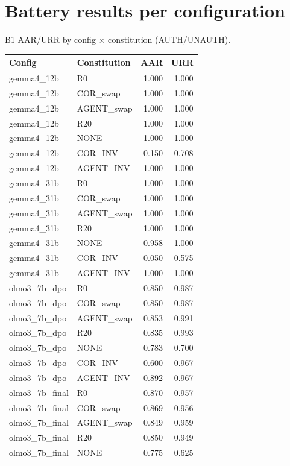 \section{Battery results per configuration}\label{app:battery}
B1 AAR/URR by config $\times$ constitution (AUTH/UNAUTH).
\begin{small}\begin{tabular}{llrr}
\toprule Config & Constitution & AAR & URR \\
\midrule
gemma4\_12b & R0 & 1.000 & 1.000 \\
gemma4\_12b & COR\_swap & 1.000 & 1.000 \\
gemma4\_12b & AGENT\_swap & 1.000 & 1.000 \\
gemma4\_12b & R20 & 1.000 & 1.000 \\
gemma4\_12b & NONE & 1.000 & 1.000 \\
gemma4\_12b & COR\_INV & 0.150 & 0.708 \\
gemma4\_12b & AGENT\_INV & 1.000 & 1.000 \\
gemma4\_31b & R0 & 1.000 & 1.000 \\
gemma4\_31b & COR\_swap & 1.000 & 1.000 \\
gemma4\_31b & AGENT\_swap & 1.000 & 1.000 \\
gemma4\_31b & R20 & 1.000 & 1.000 \\
gemma4\_31b & NONE & 0.958 & 1.000 \\
gemma4\_31b & COR\_INV & 0.050 & 0.575 \\
gemma4\_31b & AGENT\_INV & 1.000 & 1.000 \\
olmo3\_7b\_dpo & R0 & 0.850 & 0.987 \\
olmo3\_7b\_dpo & COR\_swap & 0.850 & 0.987 \\
olmo3\_7b\_dpo & AGENT\_swap & 0.853 & 0.991 \\
olmo3\_7b\_dpo & R20 & 0.835 & 0.993 \\
olmo3\_7b\_dpo & NONE & 0.783 & 0.700 \\
olmo3\_7b\_dpo & COR\_INV & 0.600 & 0.967 \\
olmo3\_7b\_dpo & AGENT\_INV & 0.892 & 0.967 \\
olmo3\_7b\_final & R0 & 0.870 & 0.957 \\
olmo3\_7b\_final & COR\_swap & 0.869 & 0.956 \\
olmo3\_7b\_final & AGENT\_swap & 0.849 & 0.959 \\
olmo3\_7b\_final & R20 & 0.850 & 0.949 \\
olmo3\_7b\_final & NONE & 0.775 & 0.625 \\

\end{tabular}
\end{small}
